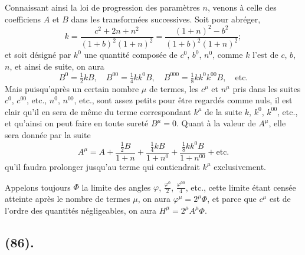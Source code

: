 \documentclass{article}
\begin{document}
Connaissant ainsi la loi de progression des paramètres $n$, venons à celle des coefficiens $A$ et $B$ dans les transformées successives. Soit pour abréger,
\[ k=\frac{c^{2}+2n+n^{2}}{(1+b)^{2}(1+n)^{2}}=\frac{(1+n)^{2}-b^{2}}{(1+b)^{2}(1+n)^{2}}; \]
et soit désigné par $k^{0}$ une quantité composée de $c^{0}$, $b^{0}$, $n^{0}$, comme $k$ l'est de $c$, $b$, $n$, et ainsi de suite, on aura
\[ B^{0}=\tfrac{1}{2}kB,\quad B^{00}=\tfrac{1}{4}kk^{0}B,\quad B^{000}=\tfrac{1}{8}kk^{0}k^{00}B,\quad\text{etc.} \]
Mais puisqu'après un certain nombre $\mu$ de termes, les $c^{\mu}$ et $n^{\mu}$ pris dans les suites $c^{0}$, $c^{00}$, etc., $n^{0}$, $n^{00}$, etc., sont assez petits pour être regardés comme nuls, il est clair qu'il en sera de même du terme correspondant $k^{\mu}$ de la suite $k$, $k^{0}$, $k^{00}$, etc., et qu'ainsi on peut faire en toute sureté $B^{\mu}=0$. Quant à la valeur de $A^{\mu}$, elle sera donnée par la suite
\[ A^{\mu}=A+\frac{\tfrac{1}{2}B}{1+n}+\frac{\tfrac{1}{4}kB}{1+n^{0}}+\frac{\tfrac{1}{8}kk^{0}B}{1+n^{00}}+\text{etc.} \]
qu'il faudra prolonger jusqu'au terme qui contiendrait $k^{\mu}$ exclusivement.

Appelons toujours $\Phi$ la limite des angles $\varphi$, $\frac{\varphi^{0}}{2}$, $\frac{\varphi^{00}}{4}$, etc., cette limite étant censée atteinte après le nombre de termes $\mu$, on aura $\varphi^{\mu}=2^{\mu}\Phi$, et parce que $c^{\mu}$ est de l'ordre des quantités négligeables, on aura $H^{\mu}=2^{\mu}A^{\mu}\Phi$.

\subsection*{(86).}
\end{document}
